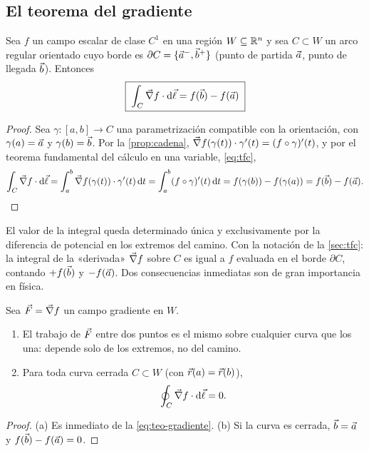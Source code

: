 \subsection{El teorema del gradiente}\label{sec:teorema-gradiente}
\begin{teorema}\label{teo:gradiente}
Sea $f$ un campo escalar de clase $C^{1}$ en una región $W\subseteq\mathbb{R}^{n}$ y sea
$C\subset W$ un arco regular orientado cuyo borde es $\partial C=\{\vec{a}^{-},\vec{b}^{+}\}$
(punto de partida $\vec{a}$, punto de llegada $\vec{b}$). Entonces
\begin{equation}\label{eq:teo-gradiente}
  \boxed{\;\int_{C}\vec{\nabla} f\cdot\mathrm{d}\vec{\ell}=f(\vec{b})-f(\vec{a})\;}
\end{equation}
\end{teorema}
\begin{proof}
Sea $\gamma:[a,b]\to C$ una parametrización compatible con la orientación, con
$\gamma(a)=\vec{a}$ y $\gamma(b)=\vec{b}$. Por la \cref{prop:cadena},
$\vec{\nabla} f(\gamma(t))\cdot\gamma'(t)=(f\circ\gamma)'(t)$, y por el teorema
fundamental del cálculo en una variable, \eqref{eq:tfc},
\[
  \int_C\vec{\nabla} f\cdot\mathrm{d}\vec{\ell}=\int_a^b\vec{\nabla} f(\gamma(t))\cdot\gamma'(t)\,\mathrm{d} t
  =\int_a^b(f\circ\gamma)'(t)\,\mathrm{d} t=f(\gamma(b))-f(\gamma(a))=f(\vec{b})-f(\vec{a}).\qedhere
\]
\end{proof}

El valor de la integral queda determinado única y exclusivamente por la
diferencia de potencial en los extremos del camino. Con la notación de la
\cref{sec:tfc}: la integral de la «derivada» $\vec{\nabla} f$ sobre $C$ es igual a $f$
evaluada en el borde $\partial C$, contando $+f(\vec{b})$ y $-f(\vec{a})$. Dos
consecuencias inmediatas son de gran importancia en física.

\begin{corolario}\label{cor:gradiente}
Sea $\vec{F}=\vec{\nabla} f$ un campo gradiente en $W$.
\begin{enumerate}[label=(\alph*)]
  \item El trabajo de $\vec{F}$ entre dos puntos es el mismo sobre cualquier curva
        que los una: depende solo de los extremos, no del camino.
  \item Para toda curva cerrada $C\subset W$ (con $\vec{r}(a)=\vec{r}(b)$),
        \begin{equation}\label{eq:circulacion-nula}
          \oint_C\vec{\nabla} f\cdot\mathrm{d}\vec{\ell}=0 .
        \end{equation}
\end{enumerate}
\end{corolario}
\begin{proof}
(a) Es inmediato de la \cref{eq:teo-gradiente}. (b) Si la curva es cerrada,
$\vec{b}=\vec{a}$ y $f(\vec{b})-f(\vec{a})=0$.
\end{proof}

